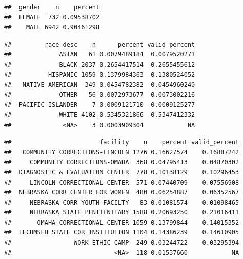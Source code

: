 \documentclass[]{book}
\newenvironment{Shaded}{\begin{snugshade}}{\end{snugshade}}
\newcommand{\KeywordTok}[1]{\textcolor[rgb]{0.13,0.29,0.53}{\textbf{#1}}}
\newcommand{\NormalTok}[1]{#1}
\newcommand{\OperatorTok}[1]{\textcolor[rgb]{0.81,0.36,0.00}{\textbf{#1}}}
\newcommand{\StringTok}[1]{\textcolor[rgb]{0.31,0.60,0.02}{#1}}
\begin{document}
\begin{Shaded}
\end{Shaded}

\begin{verbatim}
##  gender    n    percent
##  FEMALE  732 0.09538702
##    MALE 6942 0.90461298
\end{verbatim}

\begin{Shaded}
\end{Shaded}

\begin{verbatim}
##         race_desc    n      percent valid_percent
##             ASIAN   61 0.0079489184  0.0079520271
##             BLACK 2037 0.2654417514  0.2655455612
##          HISPANIC 1059 0.1379984363  0.1380524052
##   NATIVE AMERICAN  349 0.0454782382  0.0454960240
##             OTHER   56 0.0072973677  0.0073002216
##  PACIFIC ISLANDER    7 0.0009121710  0.0009125277
##             WHITE 4102 0.5345321866  0.5347412332
##              <NA>    3 0.0003909304            NA
\end{verbatim}

\begin{Shaded}
\end{Shaded}

\begin{verbatim}
##                        facility    n    percent valid_percent
##   COMMUNITY CORRECTIONS-LINCOLN 1276 0.16627574    0.16887242
##     COMMUNITY CORRECTIONS-OMAHA  368 0.04795413    0.04870302
##  DIAGNOSTIC & EVALUATION CENTER  778 0.10138129    0.10296453
##     LINCOLN CORRECTIONAL CENTER  571 0.07440709    0.07556908
##  NEBRASKA CORR CENTER FOR WOMEN  480 0.06254887    0.06352567
##     NEBRASKA CORR YOUTH FACILTY   83 0.01081574    0.01098465
##     NEBRASKA STATE PENITENTIARY 1588 0.20693250    0.21016411
##       OMAHA CORRECTIONAL CENTER 1059 0.13799844    0.14015352
##  TECUMSEH STATE COR INSTITUTION 1104 0.14386239    0.14610905
##                 WORK ETHIC CAMP  249 0.03244722    0.03295394
##                            <NA>  118 0.01537660            NA
\end{verbatim}
\end{document}
